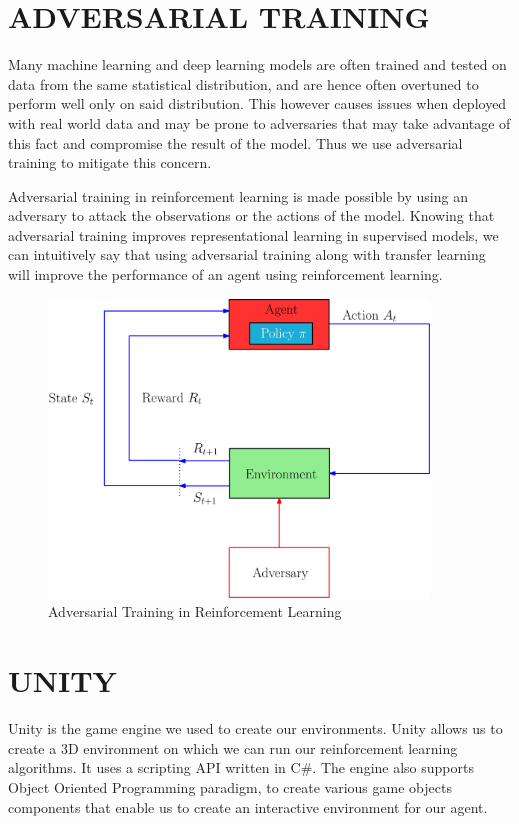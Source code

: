 \section{ADVERSARIAL TRAINING}

Many machine learning and deep learning models are often trained and tested on data from the same statistical distribution, and are hence often overtuned to perform well only on said distribution. This however causes issues when deployed with real world data and may be prone to adversaries that may take advantage of this fact and compromise the result of the model. Thus we use adversarial training to mitigate this concern. 

Adversarial training in reinforcement learning is made possible by using an adversary to attack the observations or the actions of the model. Knowing that adversarial training improves representational learning in supervised models, we can intuitively say that using adversarial training along with transfer learning will improve the performance of an agent using reinforcement learning.

\begin{figure}[H]
    \centering
    \includegraphics[width=0.9\textwidth]{images/rl_atv3.png}
    \caption{Adversarial Training in Reinforcement Learning}
    \label{fig:rl}
\end{figure}

\section{UNITY}

Unity is the game engine we used to create our environments. Unity allows us to create a 3D environment on which we can run our reinforcement learning algorithms. It uses a scripting API written in C\#. The engine also supports Object Oriented Programming paradigm, to create various game objects components that enable us to create an interactive environment for our agent.

